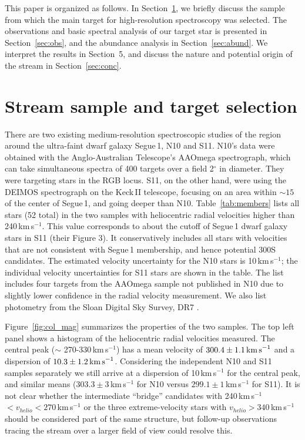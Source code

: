 \documentclass{emulateapj}
\begin{document}
This paper is organized as follows. In Section~\ref{sec:medres}, we
briefly discuss the sample from which the main target for
high-resolution spectroscopy was selected. The observations and basic
spectral analysis of our target star is presented in
Section~\ref{sec:obs}, and the abundance analysis in
Section~\ref{sec:abund}. We interpret the results in Section~5, and
discuss the nature and potential origin of the stream in
Section~\ref{sec:conc}.


\section{Stream sample and target selection}
\label{sec:medres}


There are two existing medium-resolution spectroscopic studies of the
region around the ultra-faint dwarf galaxy Segue\,1, N10 and
S11. N10's data were obtained with the Anglo-Australian Telescope's
AAOmega spectrograph, which can take simultaneous spectra of 400
targets over a field 2$^{\circ}$ in diameter. They were targeting
stars in the RGB locus. S11, on the other hand, were using the {\small
  DEIMOS} spectrograph on the Keck\,II telescope, focusing on an area
within $\sim 15$\arcmin\, of the center of Segue\,1, and going deeper
than N10. Table~\ref{tab:members} lists all stars (52 total) in the
two samples with heliocentric radial velocities higher than
240\,km\,s$^{-1}$. This value corresponds to about the cutoff of
Segue\,1 dwarf galaxy stars in S11 (their Figure 3). It conservatively
includes all stars with velocities that are not consistent with
Segue\,1 membership, and hence potential 300S candidates. The
estimated velocity uncertainty for the N10 stars is 10\,km\,s$^{-1}$;
the individual velocity uncertainties for S11 stars are shown in the
table.  The list includes four targets from the AAOmega sample not
published in N10 due to slightly lower confidence in the radial
velocity measurement. We also list photometry from the Sloan Digital
Sky Survey, DR7 \citep{Abazajian2009}.

Figure~\ref{fig:col_mag} summarizes the properties of the two
samples. The top left panel shows a histogram of the heliocentric
radial velocities measured. The central peak ($\sim$
270-330\,km\,s$^{-1}$) has a mean velocity of $300.4 \pm 1.1\,
\mbox{km\,s}^{-1}$ and a dispersion of $10.3 \pm
1.2\,\mbox{km\,s}^{-1}$. Considering the independent N10 and S11
samples separately we still arrive at a dispersion of 10\,km\,s$^{-1}$
for the central peak, and similar means ($303.3 \pm 3$\,km\,s$^{-1}$
for N10 versus $299.1 \pm 1$\,km\,s$^{-1}$ for S11). It is not clear
whether the intermediate ``bridge'' candidates with 240\,km\,s$^{-1}$
$< v_{helio} < 270$\,km\,s$^{-1}$ or the three extreme-velocity stars
with $v_{helio} > 340$\,km\,s$^{-1}$ should be considered part of the
same structure, but follow-up observations tracing the stream over a
larger field of view could resolve this. 
\end{document}
